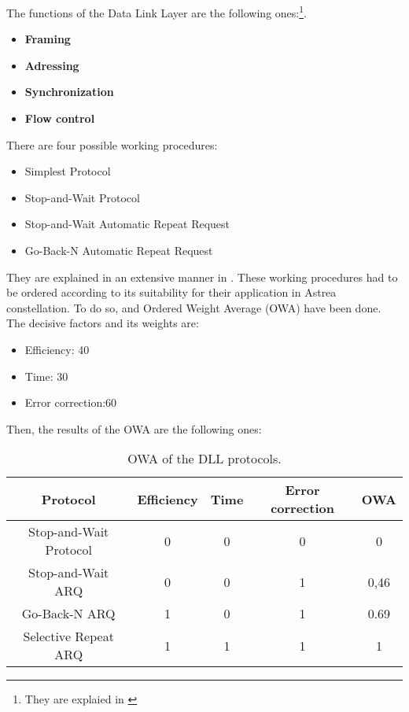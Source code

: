 The functions of the Data Link Layer are the following ones:\footnote{They are explaied in \cite[Chapter 1, Section 1]{annex3}}.

\begin{itemize}
\item \textbf{Framing}
\item \textbf{Adressing}
\item \textbf{Synchronization}
\item \textbf{Flow control}
\end{itemize}

There are four possible working procedures:

\begin{itemize}
\item Simplest Protocol
\item Stop-and-Wait Protocol
\item Stop-and-Wait Automatic Repeat Request
\item Go-Back-N Automatic Repeat Request
\end{itemize}

They are explained in an extensive manner in \cite[Chapter 1, Section 1]{annex3}. These working procedures had to be ordered according to its suitability for their application in Astrea constellation. To do so, and Ordered Weight Average (OWA) have been done. The decisive factors and its weights are: 

\begin{itemize}
\item Efficiency: 40
\item Time: 30
\item Error correction:60
\end{itemize}

Then, the results of the OWA are the following ones:

\begin{table}[H]
\begin{center}
\begin{tabular}{ | c | c | c | c | c |}
\hline
Protocol&Efficiency&Time&Error correction&OWA\\
\hline
Stop-and-Wait Protocol&0&0&0&0\\
\hline
Stop-and-Wait ARQ&0&0&1&0,46\\
\hline
Go-Back-N ARQ&1&0&1&0.69\\
\hline
Selective Repeat ARQ&1&1&1&1\\
\hline
\end{tabular}
\caption{OWA of the DLL protocols.}
\end{center}
\end{table} 

